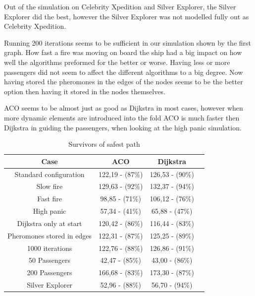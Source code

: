  Out of the simulation on Celebrity Xpedition and Silver Explorer, the Silver Explorer did the best, however the Silver Explorer was not modelled fully out as Celebrity Xpedition.

Running 200 iterations seems to be sufficient in our simulation shown by the first graph. How fast a fire was moving on board the ship had a big impact on how well the algorithms preformed for the better or worse. Having less or more passengers did not seem to affect the different algorithms to a big degree. Now having stored the pheromones in the edges of the nodes seems to be the better option then having it stored in the nodes themselves.

ACO seems to be almost just as good as Dijkstra in most cases, however when more dynamic elements are introduced into the fold ACO is much faster then Dijkstra in guiding the passengers, when looking at the high panic simulation.


\begin{table}[ht]
\caption{Survivors of safest path} 				%
\centering										%
\begin{tabular}{c c c c}						%
\hline
\hline 											%
Case & ACO & Dijkstra \\[0.5ex]%
\hline											%
Standard configuration & 122,19 - (87\%) & 126,53 - (90\%) \\
Slow fire & 129,63 - (92\%) & 132,37 - (94\%) \\
Fast fire & 98,85 - (71\%) & 106,12 - (76\%) \\
High panic & 57,34 - (41\%) & 65,88 - (47\%) \\
Dijkstra only at start & 120,42 - (86\%) & 116,44 - (83\%) \\
Pheromones stored in edges & 122,31 - (87\%) & 125,25 - (89\%) \\
1000 iterations & 122,76 - (88\%) & 126,86 - (91\%) \\
50 Passengers & 42,47 - (85\%) & 43,00 - (86\%) \\
200 Passengers & 166,68 - (83\%) & 173,30 - (87\%) \\ 
Silver Explorer & 52,96 - (88\%) & 56,70 - (94\%) \\ [1ex]						%
\hline														%

\end{tabular}
\label{table:tableSafest}								
\end{table}



